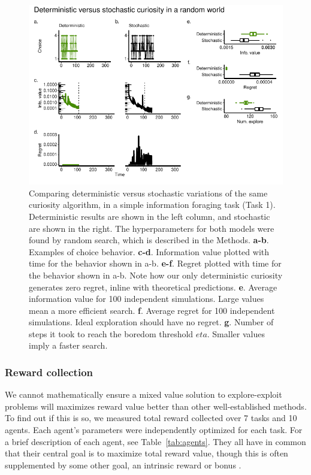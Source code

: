 \begin{figure}
	\includegraphics[width=1.0\linewidth]{img/curiosity1.pdf} 
	\caption{Comparing deterministic versus stochastic variations of the same curiosity algorithm, in a simple information foraging task (Task 1). Deterministic results are shown in the left column, and stochastic are shown in the right. The hyperparameters for both models were found by random search, which is described in the Methods.
	\textbf{a-b}. Examples of choice behavior.
	\textbf{c-d}. Information value plotted with time for the behavior shown in a-b.
	\textbf{e-f}. Regret plotted with time for the behavior shown in a-b. Note how our only deterministic curiosity generates zero regret, inline with theoretical predictions.
	\textbf{e}. Average information value for 100 independent simulations. Large values mean a more efficient search.
	\textbf{f}. Average regret for 100 independent simulations. Ideal exploration should have no regret. 
	\textbf{g}. Number of steps it took to reach the boredom threshold $eta$. Smaller values imply a faster search.
	}
	\label{fig:curiosity1} 
\end{figure}


\subsubsection*{Reward collection} 
We cannot mathematically ensure a mixed value solution to explore-exploit problems will maximizes reward value better than other well-established methods. To find out if this is so, we measured total reward collected over 7 tasks and 10 agents. Each agent's parameters were independently optimized for each task. For a brief description of each agent, see Table~\ref{tab:agents}. They all have in common that their central goal is to maximize total reward value, though this is often supplemented by some other goal, an intrinsic reward or bonus \cite{Ng1999,Sutton1998}. 

